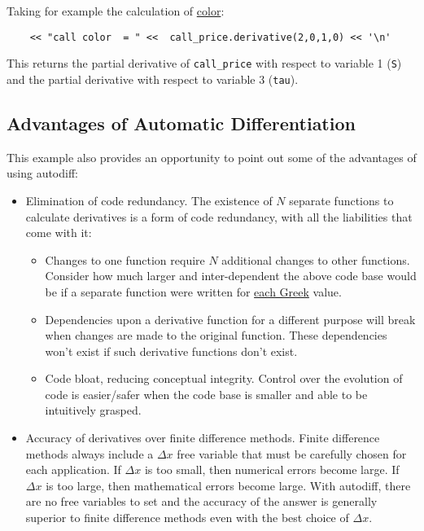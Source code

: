 \documentclass{article}
\begin{document}
Taking for example the calculation of \href{https://en.wikipedia.org/wiki/Greeks_(finance)#Color}{color}:

\begin{verbatim}
    << "call color  = " <<  call_price.derivative(2,0,1,0) << '\n'
\end{verbatim}
This returns the  partial derivative of {\tt call\_price} with respect to variable 1 ({\tt S})
and the  partial derivative with respect to variable 3 ({\tt tau}).

\subsection{Advantages of Automatic Differentiation}
This example also provides an opportunity to point out some of the advantages of using autodiff:
\begin{itemize}
\item Elimination of code redundancy. The existence of $N$ separate functions to calculate derivatives is a form
  of code redundancy, with all the liabilities that come with it:
  \begin{itemize}
    \item Changes to one function require $N$ additional changes to other functions. Consider how much larger
        and inter-dependent the above code base would be if a separate function were written for
        \href{https://en.wikipedia.org/wiki/Greeks_(finance)#Formulas_for_European_option_Greeks}{each Greek} value.
    \item Dependencies upon a derivative function for a different purpose will break when changes are made to
        the original function. These dependencies won't exist if such derivative functions don't exist.
    \item Code bloat, reducing conceptual integrity. Control over the evolution of code is easier/safer when
        the code base is smaller and able to be intuitively grasped.
  \end{itemize}
\item Accuracy of derivatives over finite difference methods. Finite difference methods always include a
   $\Delta x$ free variable that must be carefully chosen for each application. If $\Delta x$ is too small, then
   numerical errors become large. If $\Delta x$ is too large, then mathematical errors become large.  With autodiff,
   there are no free variables to set and the accuracy of the answer is generally superior to finite difference
   methods even with the best choice of $\Delta x$.
\end{itemize}
\end{document}

